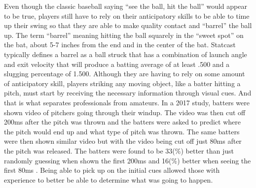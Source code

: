 \documentclass{article}
\begin{document}
\begin{doublespace}
Even though the classic baseball saying “see the ball, hit the ball” would appear to be true, players still have to rely on their anticipatory skills to be able to time up their swing so that they are able to make quality contact and “barrel” the ball up. The term “barrel” meaning hitting the ball squarely in the “sweet spot” on the bat, about 5-7 inches from the end and in the center of the bat. Statcast typically defines a barrel as a ball struck that has a combination of launch angle and exit velocity that will produce a batting average of at least .500 and a slugging percentage of 1.500. Although they are having to rely on some amount of anticipatory skill, players striking any moving object, like a batter hitting a pitch, must start by receiving the necessary information through visual cues. And that is what separates professionals from amateurs. In a 2017 study, batters were shown video of pitchers going through their windup. The video was then cut off 200ms after the pitch was thrown and the batters were asked to predict where the pitch would end up and what type of pitch was thrown. The same batters were then shown similar video but with the video being cut off just 80ms after the pitch was released. The batters were found to be 33(\%) better than just randomly guessing when shown the first 200ms and 16(\%) better when seeing the first 80ms \citep{Morris}. Being able to pick up on the initial cues allowed those with experience to better be able to determine what was going to happen.  

\end{doublespace}
\end{document}
